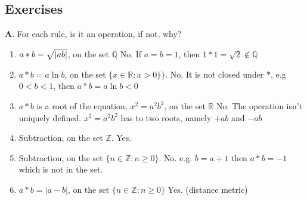 \documentclass[nohyper,nobib]{tufte-handout}
\theoremstyle{definition}
\theoremstyle{remark}
\begin{document}
\subsection{Exercises}
\textbf{A}. For each rule, is it an operation, if not, why?
\begin{enumerate}
    \item $a * b  = \sqrt{\abs{a b}}$, on the set $\mathbb{Q}$ 
        \newline
        No. If $a = b = 1$, then $1 * 1 = \sqrt{2} \not\in \mathbb{Q}$
    \item $a * b  = a\ln{b}$, on the set $\{ x \in \mathbb{R}: x > 0\} \}$.
        \newline
        No. It is not closed under $*$, e.g $0 < b < 1$, then $a * b  = a\ln{b} < 0$
    \item $a * b$ is a root of the equation, $x^2 = a^2b^2$, on the set $\mathbb{R}$
        \newline
        No. The operation isn't uniquely defined. $x^2 = a^2b^2$ has to two roots, namely $+ab$ and $-ab$
    \item Subtraction, on the set $\mathbb{Z}$. 
        \newline
        Yes. 
    \item Subtraction, on the set $\{ n \in \mathbb{Z}: n \geq 0 \}$.
        \newline
        No. e.g. $b = a + 1$ then $a * b = -1$ which is not in the set.
    \item $a * b = |a - b|$, on the set $\{ n \in \mathbb{Z}: n \geq 0\}$
        \newline
        Yes. (distance metric)
\end{enumerate}
\end{document}
